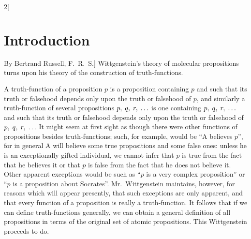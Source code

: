 \documentclass[oneside,openany,12pt]{book}
\begin{document}
\begin{multicols}{2}[\section*{Introduction}By Bertrand Russell, F.\ R.\ S.]
Wittgenstein's theory of molecular propositions turns upon his theory of the construction of truth-functions.

A truth-function of a proposition $p$ is a proposition containing $p$ and such that its truth or falsehood depends only upon the truth or falsehood of $p$, and similarly a truth-function of several propositions $p,\thickspace q,\thickspace r,\thickspace \ldots$ is one containing $p,\thickspace q,\thickspace r,\thickspace \ldots$ and such that its truth or falsehood depends only upon the truth or falsehood of $p,\thickspace q,\thickspace r,\thickspace \ldots$ It might seem at first sight as though there were other functions of propositions besides truth-functions; such, for example, would be ``A believes $p$'', for in general A will believe some true propositions and some false ones: unless he is an exceptionally gifted individual, we cannot infer that $p$ is true from the fact that he believes it or that $p$ is false from the fact that he does not believe it. Other apparent exceptions would be such as ``$p$ is a very complex proposition'' or ``$p$ is a proposition about Socrates''. Mr.\ Wittgenstein maintains, however, for reasons which will appear presently, that such exceptions are only apparent, and that every function of a proposition is really a truth-function. It follows that if we can define truth-functions generally, we can obtain a general definition of all propositions in terms of the original set of atomic propositions. This Wittgenstein proceeds to do.


\end{multicols}
\end{document}
